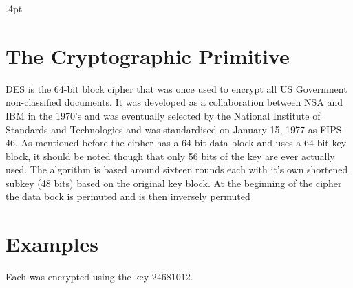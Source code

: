 \documentclass[10pt]{article}
\begin{document}
\maketitle


\newpage

\columnseprule .4pt


\def \columnseprulecolor{ \color{light-gray} }

\section{The Cryptographic Primitive}

  {DES} is the 64-bit block cipher that was once used to encrypt all US Government non-classified documents.
  It was developed as a collaboration between NSA and IBM in the 1970's and was eventually selected
  by the National Institute of Standards and Technologies and was  standardised on January 15, 1977 as FIPS-46.
  As mentioned before the cipher has a 64-bit data block and uses a 64-bit key block, it should be noted though that
  only 56 bits of the key are ever actually used. The algorithm is based around sixteen rounds each with it's own
  shortened subkey (48 bits) based on the original key block. At the beginning of the cipher the data bock is permuted
  and is then inversely permuted 


\section{Examples}
Each was encrypted using the key $24681012$.
\end{document}
